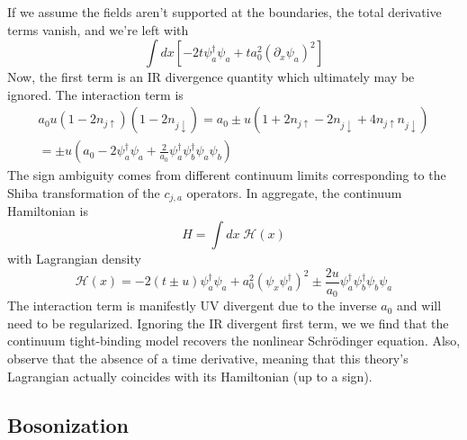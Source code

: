 \documentclass{report}
\begin{document}
If we assume the fields aren't supported at the boundaries, the total derivative 
terms vanish, and we're left with 
\begin{equation*}
	\int dx \left[
		-2t \psi_a^\dagger \psi_a + ta_0^2 (\partial_x \psi_a)^2
	\right]
\end{equation*} 
Now, the first term is an IR divergence quantity which ultimately may be ignored. 
The interaction term is 
\begin{align*}
	a_0u(1-2n_{j\uparrow})(1-2n_{j\downarrow})
		= a_0\pm u(1+2n_{j\uparrow} - 2n_{j\downarrow} + 4n_{j\uparrow} n_{j\downarrow})\\
		= \pm u \left(a_0 - 2 \psi_a^\dagger \psi_a 
			+ \frac{2}{a_0} \psi_a^\dagger \psi_b^\dagger \psi_a \psi_b \right)
\end{align*}
The sign ambiguity comes from different continuum limits corresponding to the 
Shiba transformation of the $ c_{j,a} $ operators. In aggregate, the 
continuum Hamiltonian is 
\begin{equation*}
	H = \int dx\; \mathcal{H}(x)
\end{equation*}
with Lagrangian density 
\begin{equation*}
	\mathcal{H} (x)
		= -2 (t \pm u ) \psi_a^\dagger \psi_a 
			+ a_0^2 (\psi_x\psi_a^\dagger)^2 \pm \frac{2u}{a_0}
				\psi_a^\dagger \psi_b^\dagger \psi_b \psi_a
\end{equation*}
The interaction term is manifestly UV divergent due to the inverse $ a_0 $ 
and will need to be regularized. Ignoring the IR divergent first term, we 
we find that the continuum tight-binding model recovers the nonlinear 
Schr\"odinger equation. Also, observe that the absence of a time derivative, 
meaning that this theory's Lagrangian actually coincides with its Hamiltonian
(up to a sign).

\subsection{Bosonization}


\end{document}
